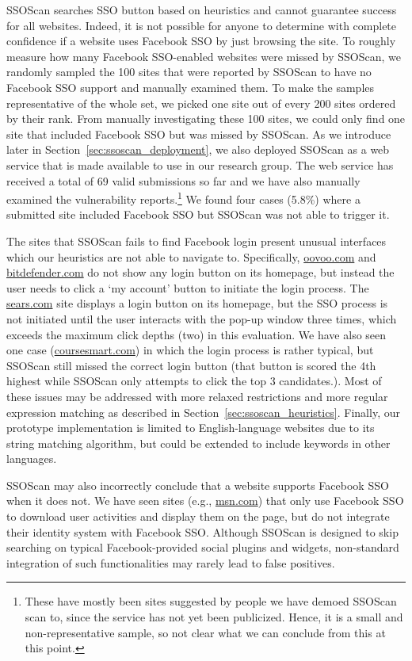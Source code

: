  SSOScan searches SSO button based on heuristics and cannot guarantee success for all websites. Indeed, it is not possible for anyone to determine with complete confidence if a website uses Facebook SSO by just browsing the site.  To roughly measure how many Facebook SSO-enabled websites were missed by SSOScan, we randomly sampled the 100 sites that were reported by SSOScan to have no Facebook SSO support and manually examined them.  To make the samples representative of the whole set, we picked one site out of every 200 sites ordered by their rank.  From manually investigating these 100 sites, we could only find one site that included Facebook SSO but was missed by SSOScan.  As we introduce later in Section~\ref{sec:ssoscan_deployment}, we also deployed SSOScan as a web service that is made available to use in our research group.  The web service has received a total of 69 valid submissions so far and we have also manually examined the vulnerability reports.\footnote{These have mostly been sites suggested by people we have demoed SSOScan scan to, since the service has not yet been publicized.  Hence, it is a small and non-representative sample, so not clear what we can conclude from this at this point.}  We found four cases (5.8\%) where a submitted site included Facebook SSO but SSOScan was not able to trigger it.

The sites that SSOScan fails to find Facebook login present unusual interfaces which our heuristics are not able to navigate to.  Specifically, \url{oovoo.com} and \url{bitdefender.com} do not show any login button on its homepage, but instead the user needs to click a `my account' button to initiate the login process.  The \url{sears.com} site displays a login button on its homepage, but the SSO process is not initiated until the user interacts with the pop-up window three times, which exceeds the maximum click depths (two) in this evaluation.  We have also seen one case (\url{coursesmart.com}) in which the login process is rather typical, but SSOScan still missed the correct login button (that button is scored the  4th highest while SSOScan only attempts to click the top 3 candidates.).  Most of these issues may be addressed with more relaxed restrictions and more regular expression matching as described in Section~\ref{sec:ssoscan_heuristics}.  Finally, our prototype implementation is limited to English-language websites due to its string matching algorithm, but could be extended to include keywords in other languages.

SSOScan may also incorrectly conclude that a website supports Facebook SSO when it does not.  We have seen sites (e.g., \url{msn.com}) that only use Facebook SSO to download user activities and display them on the page, but do not integrate their identity system with Facebook SSO.  Although SSOScan is designed to skip searching on typical Facebook-provided social plugins and widgets, non-standard integration of such functionalities may rarely lead to false positives.

